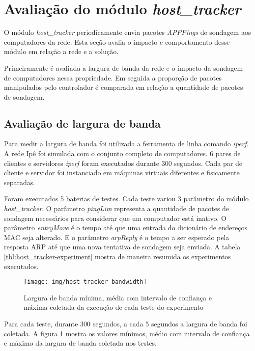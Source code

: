 \break
\section{Avaliação do módulo \emph{host\_tracker}}

O módulo \emph{host\_tracker} periodicamente envia pacotes \emph{APPPings} de
sondagem aos computadores da rede.
Esta seção avalia o impacto e comportamento desse módulo em relação a rede e
a solução.

Primeiramente é avaliada a largura de banda da rede e o impacto da sondagem
de computadores nessa propriedade.
Em seguida a proporção de pacotes manipulados pelo controlador é comparada
em relação a quantidade de pacotes de sondagem.

\subsection{Avaliação de largura de banda}

Para medir a largura de banda foi utilizada a ferramenta de linha comando
\emph{iperf}.
A rede Ipê foi simulada com o conjunto completo de computadores.
6 pares de clientes e servidores \emph{iperf} foram executados durante 300
segundos.
Cada par de cliente e servidor foi instanciado em máquinas virtuais
diferentes e fisicamente separadas.



Foram executados 5 baterias de testes.
Cada teste variou 3 parâmetro do módulo \emph{host\_tracker}.
O parâmetro \emph{pingLim} representa a quantidade de pacotes de sondagem
necessários para considerar que um computador está inativo.
O parâmetro \emph{entryMove} é o tempo até que uma entrada do dicionário de
endereços MAC seja alterado.
E o parâmetro \emph{arpReply} é o tempo a ser esperado pela resposta ARP até
que uma nova tentativa de sondagem seja enviada.
A tabela \ref{tbl:host_tracker-experiment} mostra de maneira resumida os
experimentos executados.

\begin{figure}[!htb]
    \centering
    \label{fig:host_tracker-bandwidth}
    \texttt{[image: img/host\_tracker-bandwidth]}
    \caption{Largura de banda mínima, média com intervalo de confiança e máxima
    coletada da execução de cada teste do experimento}
\end{figure}

Para cada teste, durante 300 segundos, a cada 5 segundos a largura de banda
foi coletada.
A figura \ref{fig:host_tracker-bandwidth} mostra os valores mínimos, médio
com intervalo de confiança e máximo da largura de banda coletada nos testes.

